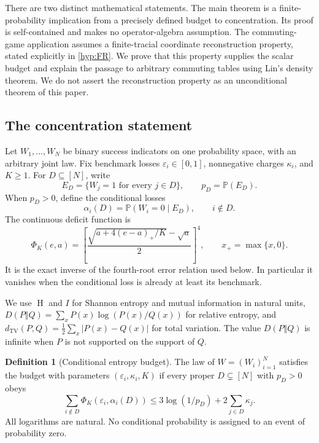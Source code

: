 \documentclass[11pt,reqno]{amsart}
\numberwithin{equation}{section}
\theoremstyle{definition}
\newtheorem{definition}[theorem]{Definition}
\theoremstyle{remark}
\newcommand{\Pp}{\mathbb P}
\newcommand{\eps}{\varepsilon}
\newcommand{\TV}{d_{\mathrm{TV}}}
\newcommand{\PhiK}{\Phi_K}
\DeclareMathOperator{\Ent}{H}
\begin{document}
There are two distinct mathematical statements. The main theorem is a finite-probability implication from a precisely defined budget to concentration. Its proof is self-contained and makes no operator-algebra assumption. The commuting-game application assumes a finite-tracial coordinate reconstruction property, stated explicitly in \cref{hyp:FR}. We prove that this property supplies the scalar budget and explain the passage to arbitrary commuting tables using Lin's density theorem. We do not assert the reconstruction property as an unconditional theorem of this paper.

\subsection{The concentration statement}
Let \(W_1,\ldots,W_N\) be binary success indicators on one probability space, with an arbitrary joint law. Fix benchmark losses \(\eps_i\in[0,1]\), nonnegative charges \(\kappa_i\), and \(K\ge1\). For \(D\subseteq[N]\), write
\[
 E_D=\{W_j=1\text{ for every }j\in D\},\qquad p_D=\Pp(E_D).
\]
When \(p_D>0\), define the conditional losses
\[
 \alpha_i(D)=\Pp(W_i=0\mid E_D),\qquad i\notin D.
\]
The continuous deficit function is
\begin{equation}\label{eq:phi}
 \PhiK(e,a)=
 \left[\frac{\sqrt{a+4(e-a)_+/K}-\sqrt a}{2}\right]^4,
 \qquad x_+=\max\{x,0\}.
\end{equation}
It is the exact inverse of the fourth-root error relation used below. In particular it vanishes when the conditional loss is already at least its benchmark.

We use \(\Ent\) and \(I\) for Shannon entropy and mutual information in natural units, \(D(P\Vert Q)=\sum_xP(x)\log(P(x)/Q(x))\) for relative entropy, and \(\TV(P,Q)=\frac12\sum_x|P(x)-Q(x)|\) for total variation. The value \(D(P\Vert Q)\) is infinite when \(P\) is not supported on the support of \(Q\).

\begin{definition}[Conditional entropy budget]\label{def:budget}
The law of \(W=(W_i)_{i=1}^N\) satisfies the budget with parameters \((\eps_i,\kappa_i,K)\) if every proper \(D\subsetneq[N]\) with \(p_D>0\) obeys
\begin{equation}\label{eq:budget}
 \sum_{i\notin D}\PhiK(\eps_i,\alpha_i(D))
 \le 3\log(1/p_D)+2\sum_{j\in D}\kappa_j.
\end{equation}
All logarithms are natural. No conditional probability is assigned to an event of probability zero.
\end{definition}
\end{document}
